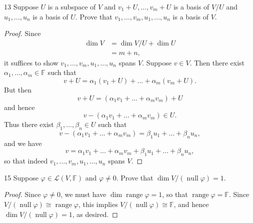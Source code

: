 \documentclass[11pt]{extarticle}
\newenvironment{problem}[1]{\begin{prob*}{#1}{}}{\end{prob*}}
\newcommand{\F}{\mathbb{F}}
\newcommand{\Hom}{\mathcal{L}}
\DeclareMathOperator{\Null}{null}
\DeclareMathOperator{\Range}{range}
\begin{document}
\begin{problem}{13}
Suppose $U$ is a subspace of $V$ and $v_1+U,\dots,v_m+U$ is a basis of $V/U$ and $u_1,\dots,u_n$ is a basis of $U$.  Prove that $v_1,\dots,v_m,u_1,\dots,u_n$ is a basis of $V$.
\end{problem}
\begin{proof}
Since 
\begin{align*}
\dim V &= \dim V/U + \dim U\\
&= m + n,
\end{align*}
it suffices to show $v_1,\dots, v_m,u_1,\dots,u_n$ spans $V$.  Suppose $v\in V$.  Then there exist $\alpha_1,\dots,\alpha_m\in\F$ such that
\begin{equation*}
v + U = \alpha_1(v_1 + U) + \dots + \alpha_m(v_m + U).
\end{equation*}
But then
\begin{equation*}
v + U = \left(\alpha_1v_1 + \dots + \alpha_mv_m\right) + U
\end{equation*}
and hence 
\begin{equation*}
v - \left(\alpha_1v_1 + \dots + \alpha_mv_m\right) \in U.
\end{equation*}
Thus there exist $\beta_1,\dots, \beta_n\in U$ such that
\begin{equation*}
v - \left(\alpha_1v_1 + \dots + \alpha_mv_m\right) = \beta_1u_1 + \dots + \beta_nu_n,
\end{equation*}
and we have
\begin{equation*}
v = \alpha_1v_1 + \dots + \alpha_mv_m +  \beta_1u_1 + \dots + \beta_nu_n,
\end{equation*}
so that indeed $v_1,\dots,v_m,u_1,\dots,u_n$ spans $V$.
\end{proof}

\begin{problem}{15}
Suppose $\varphi\in\Hom(V,\F)$ and $\varphi\neq 0$.  Prove that $\dim V/(\Null\varphi) = 1$.
\end{problem}
\begin{proof}
Since $\varphi\neq 0$, we must have $\dim\Range\varphi = 1$, so that $\Range\varphi = \F$.  Since $V/(\Null\varphi)\cong \Range\varphi$, this implies $V/(\Null\varphi)\cong\F$, and hence $\dim V/(\Null\varphi) = 1$, as desired.
\end{proof}
\end{document}
